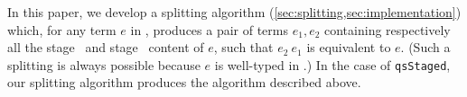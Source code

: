 In this paper, we develop a splitting algorithm
(\ref{sec:splitting,sec:implementation}) which, for any term $e$ in \lang,
produces a pair of terms $e_1,e_2$ containing respectively all the stage \bbone\
and stage \bbtwo\ content of $e$, such that $e_2~e_1$ is equivalent to $e$.
(Such a splitting is always possible because $e$ is well-typed in \lang.) In the
case of \texttt{qsStaged}, our splitting algorithm produces the algorithm
described above.





